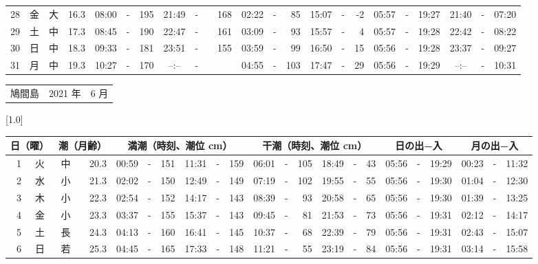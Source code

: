 \documentclass[12pt,a4j]{jsarticle}
\begin{document}
\begin{table}[htbp]
\begin{center}
{\begin{tabular}{|rc|cr|ccrccr|ccrccr|ccc|ccc|}
28 & 金 & 大 & 16.3 &  08:00 &-& 195 &  21:49 &-& 168 &  02:22 &-&  85 &  15:07 &-&  -2 & 05:57 & -& 19:27 & 21:40 & -& 07:20 \\
29 & 土 & 中 & 17.3 &  08:45 &-& 190 &  22:47 &-& 161 &  03:09 &-&  93 &  15:57 &-&   4 & 05:57 & -& 19:28 & 22:42 & -& 08:22 \\
30 & 日 & 中 & 18.3 &  09:33 &-& 181 &  23:51 &-& 155 &  03:59 &-&  99 &  16:50 &-&  15 & 05:56 & -& 19:28 & 23:37 & -& 09:27 \\
31 & 月 & 中 & 19.3 &  10:27 &-& 170 &  --:-- &-&~~~~~ &  04:55 &-& 103 &  17:47 &-&  29 & 05:56 & -& 19:29 & --:-- & -& 10:31 \\
   \hline
   \end{tabular}}
   \end{center}
\end{table}
\newpage
 \begin{table}[htbp]
 \begin{center}
 \begin{tabular}{lcc}
 \LARGE{鳩間島}  & \large{2021 年} & \large{ 6 月} \\
 \end{tabular}
 \end{center}
 \begin{center}
    \scalebox{0.7}[1.0]{
    \begin{tabular}{|rc|cr|ccrccr|ccrccr|ccc|ccc|}
    \hline
    \multicolumn{2}{|c|}{日（曜）} & \multicolumn{2}{c|}{潮（月齢）} & \multicolumn{6}{c|}{満潮（時刻、潮位 cm）} & \multicolumn{6}{c|}{干潮（時刻、潮位 cm）} & \multicolumn{3}{c|}{日の出−入} &  \multicolumn{3}{c|}{月の出−入}\\
 \hline
 1 & 火 & 中 & 20.3 &  00:59 &-& 151 &  11:31 &-& 159 &  06:01 &-& 105 &  18:49 &-&  43 & 05:56 & -& 19:29 & 00:23 & -& 11:32 \\
 2 & 水 & 小 & 21.3 &  02:02 &-& 150 &  12:49 &-& 149 &  07:19 &-& 102 &  19:55 &-&  55 & 05:56 & -& 19:30 & 01:04 & -& 12:30 \\
 3 & 木 & 小 & 22.3 &  02:54 &-& 152 &  14:17 &-& 143 &  08:39 &-&  93 &  20:58 &-&  65 & 05:56 & -& 19:30 & 01:39 & -& 13:25 \\
 4 & 金 & 小 & 23.3 &  03:37 &-& 155 &  15:37 &-& 143 &  09:45 &-&  81 &  21:53 &-&  73 & 05:56 & -& 19:31 & 02:12 & -& 14:17 \\
 5 & 土 & 長 & 24.3 &  04:13 &-& 160 &  16:41 &-& 145 &  10:37 &-&  68 &  22:39 &-&  79 & 05:56 & -& 19:31 & 02:43 & -& 15:07 \\
 6 & 日 & 若 & 25.3 &  04:45 &-& 165 &  17:33 &-& 148 &  11:21 &-&  55 &  23:19 &-&  84 & 05:56 & -& 19:31 & 03:14 & -& 15:58 \\

\end{tabular}}
\end{center}
\end{table}
\end{document}
